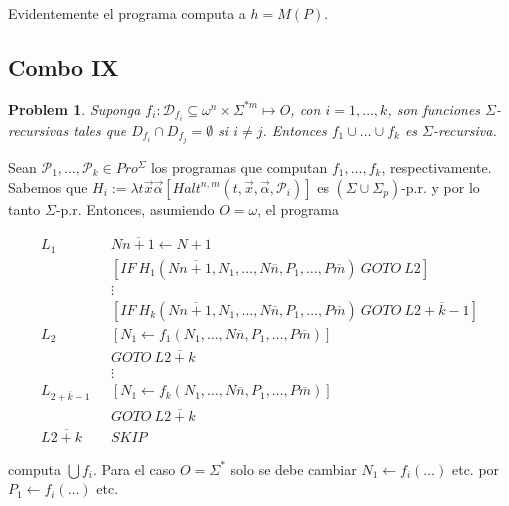 \documentclass[a4paper, 12pt]{article}
\newtheorem{problem}{Problem}
\newtheorem{problem}{Problem}
\begin{document}
Evidentemente el programa computa a $h = M(P)$.

\pagebreak 

\subsection{Combo IX}

\begin{problem}
    Suponga $f_i : \mathcal{D}_{f_i} \subseteq \omega^{n} \times \Sigma^{*m}
    \mapsto O$, con $i = 1,\ldots, k$, son funciones $\Sigma$-recursivas tales
    que $D_{f_i} \cap D_{f_j} = \emptyset$ si $i \neq j$. Entonces $f_1 \cup
    \ldots \cup f_k$ es $\Sigma$-recursiva. 
\end{problem}

Sean $\mathcal{P}_1, \ldots, \mathcal{P}_k \in Pro^{\Sigma}$ los programas que
computan $f_1, \ldots, f_k$, respectivamente. Sabemos que $H_i := \lambda t
\vec{x}\vec{\alpha} \left[ Halt^{n, m}(t, \vec{x}, \vec{\alpha}, \mathcal{P}_i)  \right]$
es $(\Sigma \cup \Sigma_p)$-p.r. y por lo tanto $\Sigma$-p.r. Entonces,
asumiendo $O = \omega$, el
programa 

\begin{align*}
    L_{1} ~ ~ ~ &N \overline{n+1} \leftarrow N+1 \\ 
                 &[IF ~ H_1(N\overline{n+1}, N_1, \ldots, N\overline{n}, P_1,
                 \ldots, P\overline{m}) ~ GOTO ~ L 2]\\
                 &\vdots\\
                 &[IF ~ H_k(N\overline{n+1}, N_1, \ldots, N\overline{n}, P_1,
                 \ldots, P\overline{m}) ~ GOTO ~ L \overline{2 + k - 1}]\\ 
    L_2 ~ ~ ~ & [N_1 \leftarrow  f_1(N_1, \ldots, N\overline{n}, P_1, \ldots,
    P\overline{m})] \\ 
              &GOTO ~ L\overline{2+k}\\
              &\vdots \\ 
    L_\overline{2 + k - 1} ~ ~ ~ & [N_1 \leftarrow  f_k(N_1, \ldots, N\overline{n}, P_1, \ldots,
    P\overline{m})] \\ 
              &GOTO ~ L\overline{2+k}\\ 
    L\overline{2+k} ~ ~ ~ & SKIP
\end{align*}

computa $\bigcup f_i$. Para el caso $O = \Sigma^{*}$ solo se debe cambiar $N_1
\leftarrow  f_i(\ldots)$ etc. por $P_1 \leftarrow  f_i(\ldots)$ etc.
\end{document}
